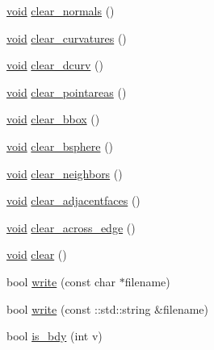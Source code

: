 \begin{DoxyCompactItemize}
\item 
\hyperlink{namespacetrimesh_a784ddfd979e1c579bda795a8edfc3f43}{void} \hyperlink{classtrimesh_1_1TriMesh_a1204da05525430aa5dcca09d2e6c34ec}{clear\+\_\+normals} ()
\item 
\hyperlink{namespacetrimesh_a784ddfd979e1c579bda795a8edfc3f43}{void} \hyperlink{classtrimesh_1_1TriMesh_a1adaa3a2bba086b06079887f6ce29d5f}{clear\+\_\+curvatures} ()
\item 
\hyperlink{namespacetrimesh_a784ddfd979e1c579bda795a8edfc3f43}{void} \hyperlink{classtrimesh_1_1TriMesh_a0a288ef4ecae755ca55e7c5d01653dfa}{clear\+\_\+dcurv} ()
\item 
\hyperlink{namespacetrimesh_a784ddfd979e1c579bda795a8edfc3f43}{void} \hyperlink{classtrimesh_1_1TriMesh_a274e2b66ea228b953707d5be1292d6b4}{clear\+\_\+pointareas} ()
\item 
\hyperlink{namespacetrimesh_a784ddfd979e1c579bda795a8edfc3f43}{void} \hyperlink{classtrimesh_1_1TriMesh_a32dd81027a1e6f9a10e854361b61d06d}{clear\+\_\+bbox} ()
\item 
\hyperlink{namespacetrimesh_a784ddfd979e1c579bda795a8edfc3f43}{void} \hyperlink{classtrimesh_1_1TriMesh_a3f1eb523e86f8bdbde9a5c8a1b0b9097}{clear\+\_\+bsphere} ()
\item 
\hyperlink{namespacetrimesh_a784ddfd979e1c579bda795a8edfc3f43}{void} \hyperlink{classtrimesh_1_1TriMesh_ad37303de2ad5098a44831248a0bebc93}{clear\+\_\+neighbors} ()
\item 
\hyperlink{namespacetrimesh_a784ddfd979e1c579bda795a8edfc3f43}{void} \hyperlink{classtrimesh_1_1TriMesh_aecd83e291489afef14a14c5f7135d8b8}{clear\+\_\+adjacentfaces} ()
\item 
\hyperlink{namespacetrimesh_a784ddfd979e1c579bda795a8edfc3f43}{void} \hyperlink{classtrimesh_1_1TriMesh_ad51e9f5574e2fb77be1a1451bc98966d}{clear\+\_\+across\+\_\+edge} ()
\item 
\hyperlink{namespacetrimesh_a784ddfd979e1c579bda795a8edfc3f43}{void} \hyperlink{classtrimesh_1_1TriMesh_aa2a446b6530bf915aea4464a65216656}{clear} ()
\item 
bool \hyperlink{classtrimesh_1_1TriMesh_a2c99b75b0ccedd7a9ea91e6f7350f390}{write} (const char $\ast$filename)
\item 
bool \hyperlink{classtrimesh_1_1TriMesh_aa9dd50ce8dcc13a09f5f7bdf535db68c}{write} (const \+::std\+::string \&filename)
\item 
bool \hyperlink{classtrimesh_1_1TriMesh_a176319b9d4c9c9e48047ad3c94aea083}{is\+\_\+bdy} (int v)
\item 

\end{DoxyCompactItemize}
